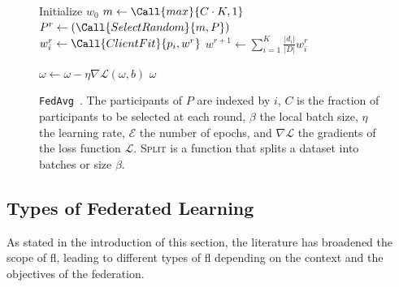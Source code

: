 \begin{figure}
  \centering
  \begin{minipage}{.8\textwidth}
    \begin{small}
      \begin{algorithm}[H]
        \caption{
          \texttt{FedAvg}~\cite{mcmahan_Communicationefficientlearningdeep_2017}.
          The participants of $P$ are indexed by $i$, $C$ is the fraction of participants to be selected at each round, $\beta$ the local batch size, $\eta$ the learning rate, $\mathcal{E}$ the number of epochs, and $\nabla\mathcal{L}$ the gradients of the loss function $\mathcal{L}$. \textsc{Split} is a function that splits a dataset into batches or size $\beta$.
          \label{alg:fedavg}
        }
        \begin{algorithmic}[1]
          
          \State Initialize $w_0$
            \State $ m \gets \Call{max}{C \cdot K, 1} $
            \State $ P^r \gets (\Call{SelectRandom}{m, P}) $
              \State $ w_i^r \gets \Call{ClientFit}{p_i, w^r} $
            \EndFor
            \State $ w^{r+1} \gets \sum_{i=1}^{K} \frac{|d_i|}{|D|} w_i^r $
          \EndFor
          
          \Statex
                \State $ \omega \gets \omega - \eta \nabla \mathcal{L}(\omega,b) $
              \EndFor
            \EndFor
            \Statex
            \State \Return $\omega$
          \EndFunction
        \end{algorithmic}
        \end{algorithm}
      \end{small}
  \end{minipage}
\end{figure}


\subsection{Types of Federated Learning\label{sec:bg.fl.types}}

As stated in the introduction of this section, the literature has broadened the scope of \gls{fl}, leading to different types of \gls{fl} depending on the context and the objectives of the federation.

